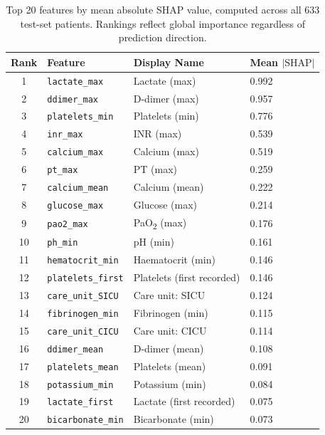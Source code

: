 \documentclass[final,3p,times]{elsarticle}
\begin{document}
\begin{table}[htbp]
\centering
\caption{Top 20 features by mean absolute SHAP value, computed across
all 633 test-set patients. Rankings reflect global importance regardless
of prediction direction.}
\label{tab:shap_top20}
\small
\begin{tabular}{clll}
\toprule
\textbf{Rank} & \textbf{Feature} & \textbf{Display Name} &
\textbf{Mean $|\text{SHAP}|$} \\
\midrule
1  & \texttt{lactate\_max}      & Lactate (max)                 & 0.992 \\
2  & \texttt{ddimer\_max}       & D-dimer (max)                 & 0.957 \\
3  & \texttt{platelets\_min}    & Platelets (min)               & 0.776 \\
4  & \texttt{inr\_max}          & INR (max)                     & 0.539 \\
5  & \texttt{calcium\_max}      & Calcium (max)                 & 0.519 \\
6  & \texttt{pt\_max}           & PT (max)                      & 0.259 \\
7  & \texttt{calcium\_mean}     & Calcium (mean)                & 0.222 \\
8  & \texttt{glucose\_max}      & Glucose (max)                 & 0.214 \\
9  & \texttt{pao2\_max}         & PaO\textsubscript{2} (max)    & 0.176 \\
10 & \texttt{ph\_min}           & pH (min)                      & 0.161 \\
11 & \texttt{hematocrit\_min}   & Haematocrit (min)             & 0.146 \\
12 & \texttt{platelets\_first}  & Platelets (first recorded)    & 0.146 \\
13 & \texttt{care\_unit\_SICU}  & Care unit: SICU               & 0.124 \\
14 & \texttt{fibrinogen\_min}   & Fibrinogen (min)              & 0.115 \\
15 & \texttt{care\_unit\_CICU}  & Care unit: CICU               & 0.114 \\
16 & \texttt{ddimer\_mean}      & D-dimer (mean)                & 0.108 \\
17 & \texttt{platelets\_mean}   & Platelets (mean)              & 0.091 \\
18 & \texttt{potassium\_min}    & Potassium (min)               & 0.084 \\
19 & \texttt{lactate\_first}    & Lactate (first recorded)      & 0.075 \\
20 & \texttt{bicarbonate\_min}  & Bicarbonate (min)             & 0.073 \\
\bottomrule
\end{tabular}
\end{table}
 
\end{document}
